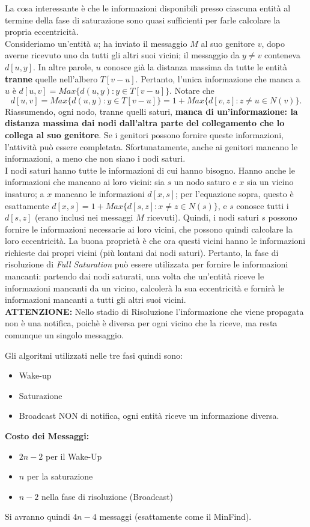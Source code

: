 La cosa interessante è che le informazioni disponibili presso ciascuna entità al
termine della fase di saturazione sono quasi sufficienti per farle calcolare la
propria eccentricità.\\
Consideriamo un'entità $u$; ha inviato il messaggio $M$ al suo genitore $v$,
dopo averne ricevuto uno da tutti gli altri suoi vicini; il messaggio da $y \neq
    v$ conteneva $d[u, y]$. In altre parole, $u$ conosce già la distanza massima da
tutte le entità \textbf{tranne} quelle nell'albero $T[v - u]$. Pertanto, l'unica
informazione che manca a $u$ è $d[u, v] = Max\{d(u, y) : y \in T[v - u]\}$.
Notare che
$$
    d[u, v] = Max\{d(u, y) : y \in T [v - u]\} = 1 + Max\{d[v, z] : z \neq u \in N (v)\}.
$$
Riassumendo, ogni nodo, tranne quelli saturi, \textbf{manca di un'informazione:
    la distanza massima dai nodi dall'altra parte del collegamento che lo collega al
    suo genitore}. Se i genitori possono fornire queste informazioni, l'attività può
essere completata. Sfortunatamente, anche ai genitori mancano le informazioni, a
meno che non siano i nodi saturi.\\
I nodi saturi hanno tutte le informazioni di cui hanno bisogno. Hanno anche le
informazioni che mancano ai loro vicini: sia $s$ un nodo saturo e $x$ sia un
vicino insaturo; a $x$ mancano le informazioni $d[x, s]$; per l'equazione sopra,
questo è esattamente $d[x, s] = 1 + Max\{d[s, z] : x \neq z \in N(s)\}$, e $s$
conosce tutti i $d[s, z]$ (erano inclusi nei messaggi $M$ ricevuti). Quindi, i
nodi saturi $s$ possono fornire le informazioni necessarie ai loro vicini, che
possono quindi calcolare la loro eccentricità. La buona proprietà è che ora
questi vicini hanno le informazioni richieste dai propri vicini (più lontani dai
nodi saturi). Pertanto, la fase di risoluzione di \textit{Full Saturation} può
essere utilizzata per fornire le informazioni mancanti: partendo dai nodi
saturati, una volta che un'entità riceve le informazioni mancanti da un vicino,
calcolerà la sua eccentricità e fornirà le informazioni mancanti a tutti gli
altri suoi vicini.\\

\textbf{ATTENZIONE:} Nello stadio di Risoluzione l'informazione che viene
propagata non è una notifica, poichè è diversa per ogni vicino che la riceve, ma
resta comunque un singolo messaggio.

Gli algoritmi utilizzati nelle tre fasi quindi sono:
\begin{itemize}
    \item Wake-up
    \item Saturazione
    \item Broadcast NON di notifica, ogni entità riceve un informazione diversa.
\end{itemize}
\textbf{Costo dei Messaggi:}
\begin{itemize}
    \item $2n-2$ per il Wake-Up
    \item $n$ per la saturazione
    \item $n-2$ nella fase di risoluzione (Broadcast)
\end{itemize}
Si avranno quindi $4n-4$ messaggi (esattamente come il MinFind).

